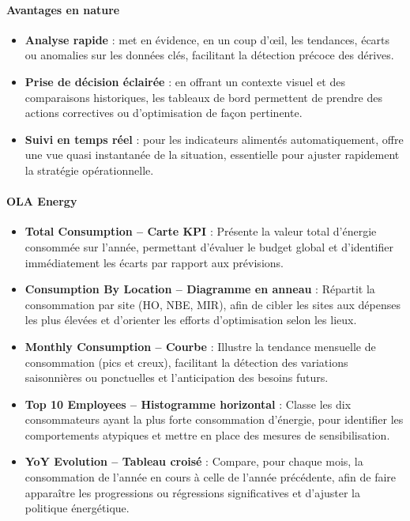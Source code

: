 \documentclass[a4paper,11pt]{report}
\begin{document}
\paragraph{Avantages en nature}
\begin{itemize}[leftmargin=*, topsep=0pt, itemsep=0pt]
  
  \item \textbf{Analyse rapide} : met en évidence, en un coup d’œil, les tendances, écarts ou anomalies sur les données clés, facilitant la détection précoce des dérives.
  \item \textbf{Prise de décision éclairée} : en offrant un contexte visuel et des comparaisons historiques, les tableaux de bord permettent de prendre des actions correctives ou d’optimisation de façon pertinente.
  \item \textbf{Suivi en temps réel} : pour les indicateurs alimentés automatiquement, offre une vue quasi instantanée de la situation, essentielle pour ajuster rapidement la stratégie opérationnelle.
\end{itemize}

\vspace{0.5em}

\paragraph{\textbf{OLA Energy}}
\begin{itemize}[leftmargin=*, topsep=0pt, itemsep=0.5em]
  \item \textbf{Total Consumption – Carte KPI} :  
    Présente la valeur total d’énergie consommée sur l’année, permettant d’évaluer le budget global et d’identifier immédiatement les écarts par rapport aux prévisions.

  \item \textbf{Consumption By Location – Diagramme en anneau} :  
    Répartit la consommation par site (HO, NBE, MIR), afin de cibler les sites aux dépenses les plus élevées et d’orienter les efforts d’optimisation selon les lieux.

  \item \textbf{Monthly Consumption – Courbe} :  
    Illustre la tendance mensuelle de consommation (pics et creux), facilitant la détection des variations saisonnières ou ponctuelles et l’anticipation des besoins futurs.

  \item \textbf{Top 10 Employees – Histogramme horizontal} :  
    Classe les dix consommateurs ayant la plus forte consommation d’énergie, pour identifier les comportements atypiques et mettre en place des mesures de sensibilisation.

  \item \textbf{YoY Evolution – Tableau croisé} :  
    Compare, pour chaque mois, la consommation de l’année en cours à celle de l’année précédente, afin de faire apparaître les progressions ou régressions significatives et d’ajuster la politique énergétique.
\end{itemize}
\end{document}
